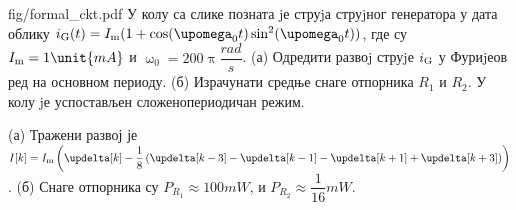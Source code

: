 \begin{slikaDesno}[1.2]{fig/formal_ckt.pdf}
    \PID 
    У колу са слике позната jе струjа струjног генератора у дата облику 
    $i_{\rm G}(t) = I_{\rm m} (1 + \cos(\upomega_0 t) \sin^2(\upomega_0 t))$,
    где су $I_{\rm m} = 1\unit{mA}$ и $\upomega_0 = 200\uppi \unit{\dfrac{rad}{s}}$.
    (а) Одредити развоj струjе $i_{\rm G}$ у Фуриjеов ред на основном периоду.
    (б) Израчунати средње снаге отпорника $R_1$ и $R_2$. У 
    колу jе успостављен сложенопериодичан режим.
\end{slikaDesno}

\REZULTAT

(а) Тражени развој је 
$I[k] = I_{\rm m} \left(
    \updelta[k] - \dfrac{1}{8}\left(
        \updelta[k-3] - \updelta[k-1] - \updelta[k+1] + \updelta[k+3]
    \right)
\right)$. (б) Снаге отпорника су 
$P_{R_1} \approx 100\unit{mW}$, и 
$P_{R_2} \approx \dfrac{1}{16}\unit{mW}$.